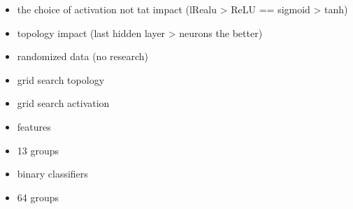 \begin{itemize}

\item the choice of activation not tat impact (lRealu > ReLU == sigmoid > tanh)
\item topology impact (last hidden layer > neurons the better)

\end{itemize}

\begin{itemize}

\item randomized data (no research)
\item grid search topology
\item grid search activation
\item features
\item 13 groups
\item binary classifiers
\item 64 groups

\end{itemize}

